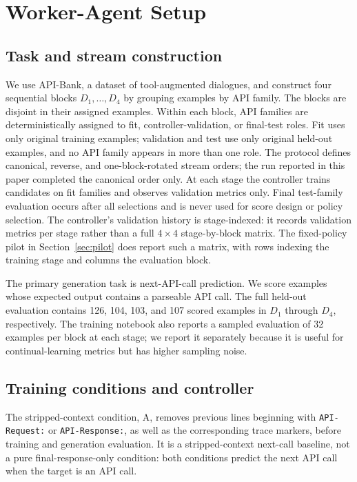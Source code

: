 \documentclass{article}
\begin{document}
\section{Worker-Agent Setup}
\label{sec:setup}

\subsection{Task and stream construction}

We use API-Bank, a dataset of tool-augmented dialogues, and construct four sequential blocks $D_1,\ldots,D_4$ by grouping examples by API family. The blocks are disjoint in their assigned examples. Within each block, API families are deterministically assigned to fit, controller-validation, or final-test roles. Fit uses only original training examples; validation and test use only original held-out examples, and no API family appears in more than one role. The protocol defines canonical, reverse, and one-block-rotated stream orders; the run reported in this paper completed the canonical order only. At each stage the controller trains candidates on fit families and observes validation metrics only. Final test-family evaluation occurs after all selections and is never used for score design or policy selection. The controller's validation history is stage-indexed: it records validation metrics per stage rather than a full $4 \times 4$ stage-by-block matrix. The fixed-policy pilot in Section~\ref{sec:pilot} does report such a matrix, with rows indexing the training stage and columns the evaluation block.

The primary generation task is next-API-call prediction. We score examples whose expected output contains a parseable API call. The full held-out evaluation contains 126, 104, 103, and 107 scored examples in $D_1$ through $D_4$, respectively. The training notebook also reports a sampled evaluation of 32 examples per block at each stage; we report it separately because it is useful for continual-learning metrics but has higher sampling noise.

\subsection{Training conditions and controller}

The stripped-context condition, A, removes previous lines beginning with \texttt{API-Request:} or \texttt{API-Response:}, as well as the corresponding trace markers, before training and generation evaluation. It is a stripped-context next-call baseline, not a pure final-response-only condition: both conditions predict the next API call when the target is an API call.
\end{document}

